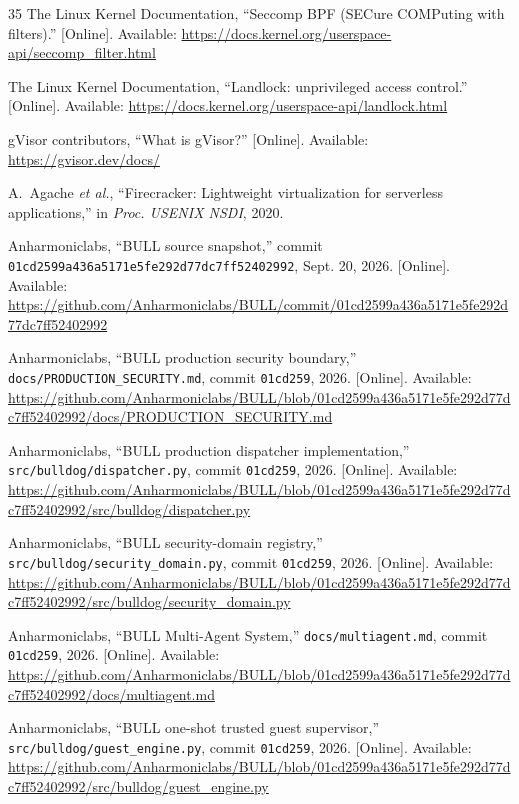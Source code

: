 \documentclass[journal]{IEEEtran}
\begin{document}
\begin{thebibliography}{35}
The Linux Kernel Documentation, ``Seccomp BPF (SECure COMPuting with filters).'' [Online]. Available: \url{https://docs.kernel.org/userspace-api/seccomp_filter.html}

The Linux Kernel Documentation, ``Landlock: unprivileged access control.'' [Online]. Available: \url{https://docs.kernel.org/userspace-api/landlock.html}

gVisor contributors, ``What is gVisor?'' [Online]. Available: \url{https://gvisor.dev/docs/}

A.~Agache \emph{et al.}, ``Firecracker: Lightweight virtualization for serverless applications,'' in \emph{Proc. USENIX NSDI}, 2020.

Anharmoniclabs, ``BULL source snapshot,'' commit \texttt{01cd2599a436a5171e5fe292d77dc7ff52402992}, Sept. 20, 2026. [Online]. Available: \url{https://github.com/Anharmoniclabs/BULL/commit/01cd2599a436a5171e5fe292d77dc7ff52402992}

Anharmoniclabs, ``BULL production security boundary,'' \texttt{docs/PRODUCTION\_SECURITY.md}, commit \texttt{01cd259}, 2026. [Online]. Available: \url{https://github.com/Anharmoniclabs/BULL/blob/01cd2599a436a5171e5fe292d77dc7ff52402992/docs/PRODUCTION_SECURITY.md}

Anharmoniclabs, ``BULL production dispatcher implementation,'' \texttt{src/bulldog/dispatcher.py}, commit \texttt{01cd259}, 2026. [Online]. Available: \url{https://github.com/Anharmoniclabs/BULL/blob/01cd2599a436a5171e5fe292d77dc7ff52402992/src/bulldog/dispatcher.py}

Anharmoniclabs, ``BULL security-domain registry,'' \texttt{src/bulldog/security\_domain.py}, commit \texttt{01cd259}, 2026. [Online]. Available: \url{https://github.com/Anharmoniclabs/BULL/blob/01cd2599a436a5171e5fe292d77dc7ff52402992/src/bulldog/security_domain.py}

Anharmoniclabs, ``BULL Multi-Agent System,'' \texttt{docs/multiagent.md}, commit \texttt{01cd259}, 2026. [Online]. Available: \url{https://github.com/Anharmoniclabs/BULL/blob/01cd2599a436a5171e5fe292d77dc7ff52402992/docs/multiagent.md}

Anharmoniclabs, ``BULL one-shot trusted guest supervisor,'' \texttt{src/bulldog/guest\_engine.py}, commit \texttt{01cd259}, 2026. [Online]. Available: \url{https://github.com/Anharmoniclabs/BULL/blob/01cd2599a436a5171e5fe292d77dc7ff52402992/src/bulldog/guest_engine.py}


\end{thebibliography}
\end{document}
